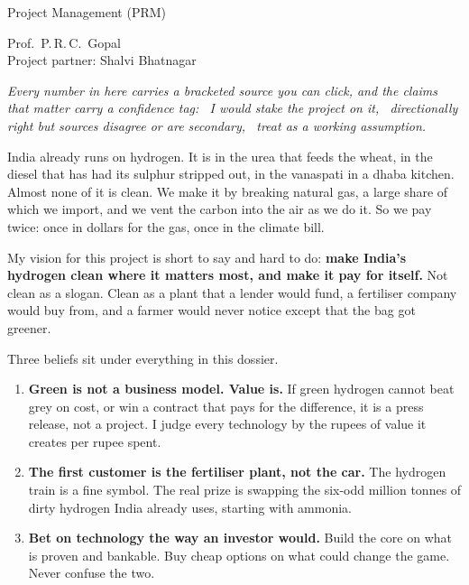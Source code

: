 \begin{minipage}[t]{0.42\textwidth}
\par\smallskip
{\large Project Management (PRM)}\par
{\small\color{ink2} Prof.\ P.\,R.\,C.\ Gopal \\ Project partner: Shalvi Bhatnagar}
\end{minipage}
\vfill
\begin{minipage}{0.92\textwidth}\small\color{ink2}\itshape
Every number in here carries a bracketed source you can click, and the claims that matter carry a confidence tag:
\confH\ I would stake the project on it, \confM\ directionally right but sources disagree or are secondary, \confL\ treat as a working assumption.
\end{minipage}
\vspace{10mm}
\newpage


India already runs on hydrogen. It is in the urea that feeds the wheat, in the diesel that has had its sulphur stripped out, in the vanaspati in a dhaba kitchen. Almost none of it is clean. We make it by breaking natural gas, a large share of which we import, and we vent the carbon into the air as we do it. So we pay twice: once in dollars for the gas, once in the climate bill.

My vision for this project is short to say and hard to do: \textbf{make India's hydrogen clean where it matters most, and make it pay for itself.} Not clean as a slogan. Clean as a plant that a lender would fund, a fertiliser company would buy from, and a farmer would never notice except that the bag got greener.

Three beliefs sit under everything in this dossier.

\begin{enumerate}[leftmargin=1.6em,label={\color{audit}\display\arabic*}]
\item \textbf{Green is not a business model. Value is.} If green hydrogen cannot beat grey on cost, or win a contract that pays for the difference, it is a press release, not a project. I judge every technology by the rupees of value it creates per rupee spent.
\item \textbf{The first customer is the fertiliser plant, not the car.} The hydrogen train is a fine symbol. The real prize is swapping the six-odd million tonnes of dirty hydrogen India already uses, starting with ammonia.
\item \textbf{Bet on technology the way an investor would.} Build the core on what is proven and bankable. Buy cheap options on what could change the game. Never confuse the two.
\end{enumerate}

